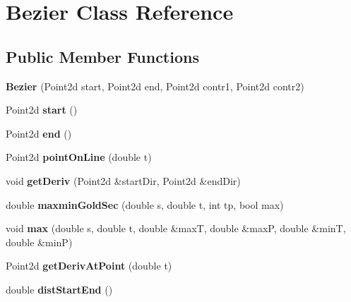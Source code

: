 \hypertarget{class_bezier}{}\section{Bezier Class Reference}
\label{class_bezier}
\subsection*{Public Member Functions}
\begin{DoxyCompactItemize}
\item 
\mbox{\label{class_bezier_a37f141b26a5f49af7d6be4847b3a872f}} 
{\bfseries Bezier} (Point2d start, Point2d end, Point2d contr1, Point2d contr2)
\item 
\mbox{\label{class_bezier_a0b64ffb10d9da4451b48d195dd448280}} 
Point2d {\bfseries start} ()
\item 
\mbox{\label{class_bezier_a0617d545e29ab3b65122de22f5b6a475}} 
Point2d {\bfseries end} ()
\item 
\mbox{\label{class_bezier_aa9f5371c733c5342d38c585990a291bb}} 
Point2d {\bfseries point\+On\+Line} (double t)
\item 
\mbox{\label{class_bezier_aba1ad5040fe3bcbb9b432c39ca599a50}} 
void {\bfseries get\+Deriv} (Point2d \&start\+Dir, Point2d \&end\+Dir)
\item 
\mbox{\label{class_bezier_a5a023b86e5aa9bd4c6b54635e9f92213}} 
double {\bfseries maxmin\+Gold\+Sec} (double s, double t, int tp, bool max)
\item 
\mbox{\label{class_bezier_a0fc581fb5a6949a6226cd7674808818c}} 
void {\bfseries max} (double s, double t, double \&maxT, double \&maxP, double \&minT, double \&minP)
\item 
\mbox{\label{class_bezier_a1be16953633431d2f605a1e5172ebc79}} 
Point2d {\bfseries get\+Deriv\+At\+Point} (double t)
\item 
\mbox{\label{class_bezier_acc2aa921cbc4431f621245d09b8ad132}} 
double {\bfseries dist\+Start\+End} ()
\item 

\end{DoxyCompactItemize}
